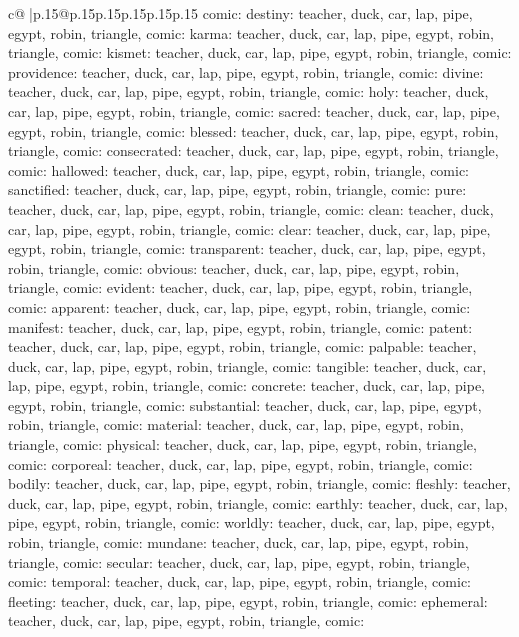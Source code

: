 \documentclass{article}
\begin{document}
{\begin{supertabular}{c@{$\;$}|p{.15\linewidth}@{}p{.15\linewidth}p{.15\linewidth}p{.15\linewidth}p{.15\linewidth}p{.15\linewidth}}
{{{comic\n\nCLUE: destiny\nTARGETS: teacher, duck, car, lap, pipe, egypt, robin, triangle, comic\n\nCLUE: karma\nTARGETS: teacher, duck, car, lap, pipe, egypt, robin, triangle, comic\n\nCLUE: kismet\nTARGETS: teacher, duck, car, lap, pipe, egypt, robin, triangle, comic\n\nCLUE: providence\nTARGETS: teacher, duck, car, lap, pipe, egypt, robin, triangle, comic\n\nCLUE: divine\nTARGETS: teacher, duck, car, lap, pipe, egypt, robin, triangle, comic\n\nCLUE: holy\nTARGETS: teacher, duck, car, lap, pipe, egypt, robin, triangle, comic\n\nCLUE: sacred\nTARGETS: teacher, duck, car, lap, pipe, egypt, robin, triangle, comic\n\nCLUE: blessed\nTARGETS: teacher, duck, car, lap, pipe, egypt, robin, triangle, comic\n\nCLUE: consecrated\nTARGETS: teacher, duck, car, lap, pipe, egypt, robin, triangle, comic\n\nCLUE: hallowed\nTARGETS: teacher, duck, car, lap, pipe, egypt, robin, triangle, comic\n\nCLUE: sanctified\nTARGETS: teacher, duck, car, lap, pipe, egypt, robin, triangle, comic\n\nCLUE: pure\nTARGETS: teacher, duck, car, lap, pipe, egypt, robin, triangle, comic\n\nCLUE: clean\nTARGETS: teacher, duck, car, lap, pipe, egypt, robin, triangle, comic\n\nCLUE: clear\nTARGETS: teacher, duck, car, lap, pipe, egypt, robin, triangle, comic\n\nCLUE: transparent\nTARGETS: teacher, duck, car, lap, pipe, egypt, robin, triangle, comic\n\nCLUE: obvious\nTARGETS: teacher, duck, car, lap, pipe, egypt, robin, triangle, comic\n\nCLUE: evident\nTARGETS: teacher, duck, car, lap, pipe, egypt, robin, triangle, comic\n\nCLUE: apparent\nTARGETS: teacher, duck, car, lap, pipe, egypt, robin, triangle, comic\n\nCLUE: manifest\nTARGETS: teacher, duck, car, lap, pipe, egypt, robin, triangle, comic\n\nCLUE: patent\nTARGETS: teacher, duck, car, lap, pipe, egypt, robin, triangle, comic\n\nCLUE: palpable\nTARGETS: teacher, duck, car, lap, pipe, egypt, robin, triangle, comic\n\nCLUE: tangible\nTARGETS: teacher, duck, car, lap, pipe, egypt, robin, triangle, comic\n\nCLUE: concrete\nTARGETS: teacher, duck, car, lap, pipe, egypt, robin, triangle, comic\n\nCLUE: substantial\nTARGETS: teacher, duck, car, lap, pipe, egypt, robin, triangle, comic\n\nCLUE: material\nTARGETS: teacher, duck, car, lap, pipe, egypt, robin, triangle, comic\n\nCLUE: physical\nTARGETS: teacher, duck, car, lap, pipe, egypt, robin, triangle, comic\n\nCLUE: corporeal\nTARGETS: teacher, duck, car, lap, pipe, egypt, robin, triangle, comic\n\nCLUE: bodily\nTARGETS: teacher, duck, car, lap, pipe, egypt, robin, triangle, comic\n\nCLUE: fleshly\nTARGETS: teacher, duck, car, lap, pipe, egypt, robin, triangle, comic\n\nCLUE: earthly\nTARGETS: teacher, duck, car, lap, pipe, egypt, robin, triangle, comic\n\nCLUE: worldly\nTARGETS: teacher, duck, car, lap, pipe, egypt, robin, triangle, comic\n\nCLUE: mundane\nTARGETS: teacher, duck, car, lap, pipe, egypt, robin, triangle, comic\n\nCLUE: secular\nTARGETS: teacher, duck, car, lap, pipe, egypt, robin, triangle, comic\n\nCLUE: temporal\nTARGETS: teacher, duck, car, lap, pipe, egypt, robin, triangle, comic\n\nCLUE: fleeting\nTARGETS: teacher, duck, car, lap, pipe, egypt, robin, triangle, comic\n\nCLUE: ephemeral\nTARGETS: teacher, duck, car, lap, pipe, egypt, robin, triangle, comic\n\nCLUE: }}}
\end{supertabular}}
\end{document}
